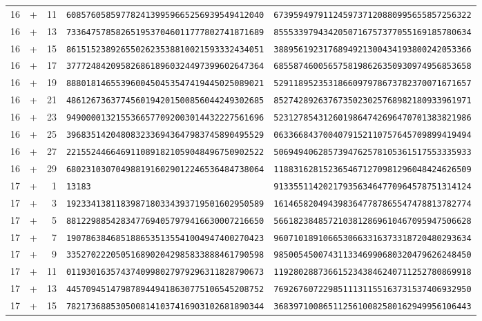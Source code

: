 \begin{longtable}{@{}rcrll@{}}
16&+&11&\texttt{6085760585977824139959665256939549412040}&\texttt{6739594979112459737120880995655857256322}\\
16&+&13&\texttt{7336475785826519537046011777802741871689}&\texttt{8555339794342050716757377055169185780634}\\
16&+&15&\texttt{8615152389265502623538810021593332434051}&\texttt{3889561923176894921300434193800242053366}\\
16&+&17&\texttt{3777248420958268618960324497399602647364}&\texttt{6855874600565758198626350930974956853658}\\
16&+&19&\texttt{8880181465539600450453547419445025089021}&\texttt{5291189523531866097978673782370071671657}\\
16&+&21&\texttt{4861267363774560194201500856044249302685}&\texttt{8527428926376735023025768982180933961971}\\
16&+&23&\texttt{9490000132155366577092003014432227561696}&\texttt{5231278543126019864742696470701383821986}\\
16&+&25&\texttt{3968351420480832336943647983745890495529}&\texttt{0633668437004079152110757645709899419494}\\
16&+&27&\texttt{2215524466469110891821059048496750902522}&\texttt{5069494062857394762578105361517553335933}\\
16&+&29&\texttt{6802310307049881916029012246536484738064}&\texttt{1188316281523654671270981296048424626509}\\
17&+&1&\texttt{13183}&\texttt{9133551142021793563464770964578751314124}\\
17&+&3&\texttt{1923341381183987180334393719501602950589}&\texttt{1614658204943983647787865547478813782774}\\
17&+&5&\texttt{8812298854283477694057979416630007216650}&\texttt{5661823848572103812869610467095947506628}\\
17&+&7&\texttt{1907863846851886535135541004947400270423}&\texttt{9607101891066530663316373318720480293634}\\
17&+&9&\texttt{3352702220505168902042985833888461790598}&\texttt{9850054500743113346990680320479626248450}\\
17&+&11&\texttt{0119301635743740998027979296311828790673}&\texttt{1192802887366152343846240711252780869918}\\
17&+&13&\texttt{4457094514798789449418630775106545208752}&\texttt{7692676072298511131155163731537406932950}\\
17&+&15&\texttt{7821736885305008141037416903102681890344}&\texttt{3683971008651125610082580162949956106443}\\

\end{longtable}
